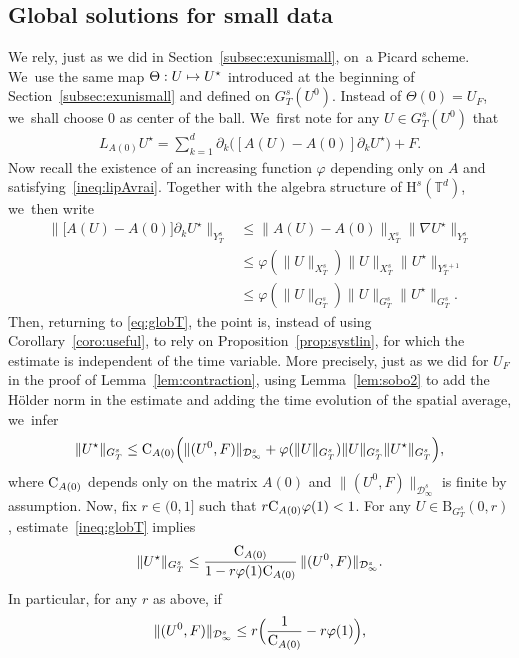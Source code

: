 \documentclass[JEP,XML,SOM,Unicode,published]{cedram}
\newcommand\mto{\mathchoice{\longmapsto}{\mapsto}{\mapsto}{\mapsto}}
\theoremstyle{definition}
\newcommand\T{\mathbb{T}}
\newcommand\B{\mathrm{B}}
\renewcommand\H{\mathrm{H}}
\let\ffi\varphi
\begin{document}
\subsection{Global solutions for small data}
We rely, just as we did in Section~\ref{subsec:exunismall}, on~a Picard scheme. We~use the same map $\Theta:U\mto U^\star$ introduced at the beginning of Section~\ref{subsec:exunismall} and defined on $G_T^s(U^0)$. Instead of $\Theta(0) = U_F$, we~shall choose $0$ as center of the ball. We~first note for any $U\in G_T^s(U^0)$ that
\begin{align}\label{eq:globT}
L_{A(0)}U^\star = \sum_{k=1}^d\partial_k\bigl([A(U)-A(0)]\partial_k U^\star\bigr) + F.
\end{align}
Now recall the existence of an increasing function $\ffi$ depending only on $A$ and satisfying~\eqref{ineq:lipAvrai}. Together with the algebra structure of $\H^s(\T^d)$, we~then write
\begin{align*}\Big\|\bigl[A(U)-A(0)\bigr]\partial_k U^\star\Big\|_{Y_T^s}&\leq \|A(U)-A(0)\|_{X_T^s}\|\nabla U^\star\|_{Y_T^s} \\
&\leq \ffi(\|U\|_{X_T^s}) \|U\|_{X_T^s}\|U^\star \|_{Y_T^{s+1}}\\
&\leq \ffi(\|U\|_{G_T^s}) \|U\|_{G_T^s}\|U^\star \|_{G_T^s}.\end{align*}
Then, returning to \eqref{eq:globT}, the point is, instead of using Corollary~\ref{coro:useful}, to rely on Proposition~\ref{prop:systlin}, for which the estimate is independent of the time variable. More precisely, just as we did for $U_F$ in the proof of Lemma~\ref{lem:contraction}, using Lemma~\ref{lem:sobo2} to add the Hölder norm in the estimate and adding the time evolution of the spatial average, we~infer
\begin{align}\label{ineq:globT}
\|U^\star\|_{G_T^s} \leq \textnormal{C}_{A(0)} \Bigl(\| (U^0,F)\| _{\mathcal D_\infty^{s}} + \ffi(\|U\|_{G_T^s})\|U\|_{G_T^s} \| U^\star\|_{G_T^s}\Bigr),
\end{align}
where $\textnormal{C}_{A(0)}$ depends only on the matrix $A(0)$ and $ \| (U^0,F)\| _{\mathcal D_\infty^{s}}$ is finite by assumption. Now, fix $r\in(0,1]$ such that $r\textnormal{C}_{A(0)}\ffi(1)<1$. For any $U\in \B_{G_T^s}(0,r)$, estimate~\eqref{ineq:globT} implies
\[
\|U^\star\|_{G_T^s} \leq \frac{\textnormal{C}_{A(0)}}{1-r\ffi(1)\textnormal{C}_{A(0)}}\, \| (U^0,F)\| _{\mathcal D_\infty^{s}}.
\]
In particular, for any $r$ as above, if
\begin{align}\label{ineq:smallnessdd}
\| (U^0,F)\| _{\mathcal D_\infty^{s}} \leq r \Bigl(\frac{1}{\textnormal{C}_{A(0)}}-r\ffi(1)\Bigr),
\end{align}
\end{document}
